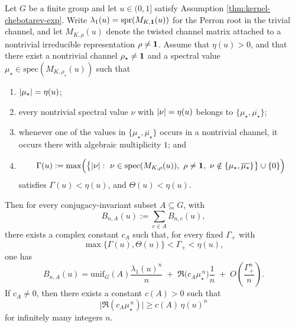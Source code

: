 \begin{theorem}\label{thm:kernel-chebotarev-second-main-term-witness}
Let \(G\) be a finite group and let \(u\in(0,1]\) satisfy Assumption \ref{thm:kernel-chebotarev-exp}. Write \(\lambda_1(u)=\operatorname{spr}(M_{K,\mathbf{1}}(u))\) for the Perron root in the trivial channel, and let \(M_{K,\rho}(u)\) denote the twisted channel matrix attached to a nontrivial irreducible representation \(\rho\neq\mathbf{1}\). Assume that \(\eta(u)>0\), and that there exist a nontrivial channel \(\rho_\star\neq\mathbf{1}\) and a spectral value \(\mu_\star\in\mathrm{spec}(M_{K,\rho_\star}(u))\) such that
\begin{enumerate}
  \item \(\lvert \mu_\star\rvert=\eta(u)\);
  \item every nontrivial spectral value \(\nu\) with \(\lvert \nu\rvert=\eta(u)\) belongs to \(\{\mu_\star,\overline{\mu_\star}\}\);
  \item whenever one of the values in \(\{\mu_\star,\overline{\mu_\star}\}\) occurs in a nontrivial channel, it occurs there with algebraic multiplicity \(1\); and
  \item
  \[
  \Gamma(u):=\max\Bigl(\bigl\{\abs{\nu}:\ \nu\in\mathrm{spec}(M_{K,\rho}(u)),\ \rho\neq\ind,\ \nu\notin\{\mu_\star,\overline{\mu_\star}\}\bigr\}\cup\{0\}\Bigr)
  \]
  satisfies \(\Gamma(u)<\eta(u)\), and \(\Theta(u)<\eta(u)\).
\end{enumerate}
Then for every conjugacy-invariant subset \(A\subseteq G\), with
\[
B_{n,A}(u):=\sum_{c\in A}B_{n,c}(u),
\]
there exists a complex constant \(c_A\) such that, for every fixed \(\Gamma_+\) with
\[
\max\{\Gamma(u),\Theta(u)\}<\Gamma_+<\eta(u),
\]
one has
\[
B_{n,A}(u)
=
\mathrm{unif}_G(A)\frac{\lambda_1(u)^n}{n}
\;+\;
\Re\!\bigl(c_A\mu_\star^{\,n}\bigr)\frac{1}{n}
\;+\;
O\!\left(\frac{\Gamma_+^n}{n}\right).
\]
If \(c_A\neq 0\), then there exists a constant \(c(A)>0\) such that
\[
\bigl|\Re(c_A\mu_\star^{\,n})\bigr|\ge c(A)\,\eta(u)^n
\]
for infinitely many integers \(n\).
\end{theorem}


